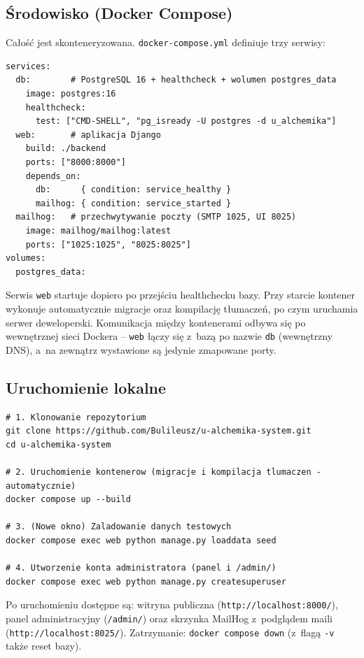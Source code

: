 \documentclass[12pt,a4paper]{article}
\begin{document}
\subsection{Środowisko (Docker Compose)}

Całość jest skonteneryzowana. \texttt{docker-compose.yml} definiuje trzy serwisy:

\begin{lstlisting}[style=yamlstyle, caption={Serwisy aplikacji (fragment docker-compose.yml)}]
services:
  db:        # PostgreSQL 16 + healthcheck + wolumen postgres_data
    image: postgres:16
    healthcheck:
      test: ["CMD-SHELL", "pg_isready -U postgres -d u_alchemika"]
  web:       # aplikacja Django
    build: ./backend
    ports: ["8000:8000"]
    depends_on:
      db:      { condition: service_healthy }
      mailhog: { condition: service_started }
  mailhog:   # przechwytywanie poczty (SMTP 1025, UI 8025)
    image: mailhog/mailhog:latest
    ports: ["1025:1025", "8025:8025"]
volumes:
  postgres_data:
\end{lstlisting}

Serwis \texttt{web} startuje dopiero po przejściu healthchecku bazy. Przy starcie
kontener wykonuje automatycznie migracje oraz kompilację tłumaczeń, po czym
uruchamia serwer deweloperski. Komunikacja między kontenerami odbywa się po
wewnętrznej sieci Dockera -- \texttt{web} łączy się z~bazą po nazwie \texttt{db}
(wewnętrzny DNS), a~na zewnątrz wystawione są jedynie zmapowane porty.

\subsection{Uruchomienie lokalne}

\begin{lstlisting}[style=consolestyle, caption={Pierwsze uruchomienie}]
# 1. Klonowanie repozytorium
git clone https://github.com/Bulileusz/u-alchemika-system.git
cd u-alchemika-system

# 2. Uruchomienie kontenerow (migracje i kompilacja tlumaczen - automatycznie)
docker compose up --build

# 3. (Nowe okno) Zaladowanie danych testowych
docker compose exec web python manage.py loaddata seed

# 4. Utworzenie konta administratora (panel i /admin/)
docker compose exec web python manage.py createsuperuser
\end{lstlisting}

Po uruchomieniu dostępne są: witryna publiczna (\texttt{http://localhost:8000/}),
panel administracyjny (\texttt{/admin/}) oraz skrzynka MailHog z~podglądem maili
(\texttt{http://localhost:8025/}). Zatrzymanie: \texttt{docker compose down}
(z~flagą \texttt{-v} także reset bazy).
\end{document}
